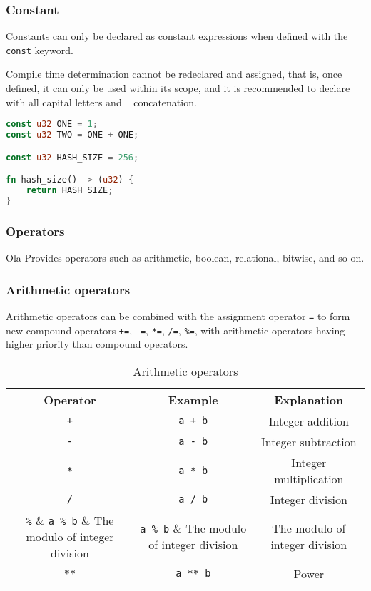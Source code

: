 \subsubsection{Constant}

Constants can only be declared as constant expressions when defined with the \texttt{const} keyword.

Compile time determination cannot be redeclared and assigned, that is, once defined, it can only be used within its scope, and it is recommended to declare with all capital letters and \texttt{\_} concatenation. 

\begin{lstlisting}[language=rust]
const u32 ONE = 1;
const u32 TWO = ONE + ONE;

const u32 HASH_SIZE = 256;

fn hash_size() -> (u32) {
    return HASH_SIZE;
}
\end{lstlisting}

\subsubsection{Operators}

Ola Provides operators such as arithmetic, boolean, relational, bitwise, and so on. 

\subsubsection*{Arithmetic operators}

Arithmetic operators can be combined with the assignment operator \verb|=| to form new compound operators \verb|+=|, \verb|-=|, \verb|*=|, \verb|/=|, \verb|%=|, with arithmetic operators having higher priority than compound operators. 

\begin{table}
\centering
\begin{tabular}{c|c|c}
    Operator & Example & Explanation \\ \hline
    \verb|+| & \verb|a + b| & Integer addition \\
    \verb|-| & \verb|a - b| & Integer subtraction \\
    \verb|*| & \verb|a * b| & Integer multiplication  \\
    \verb|/| & \verb|a / b| & Integer division \\
    \verb|%| & \verb|a % b| & The modulo of integer division \\
    \verb|**| & \verb|a ** b| & Power \\
\end{tabular}
\caption{Arithmetic operators}
\end{table}


